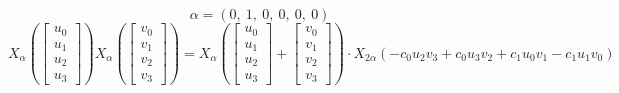 \documentclass[11pt]{article}
\theoremstyle{definition}
\begin{document}
\[
\alpha = \left( 0, \  1, \  0, \  0, \  0, \  0\right)
\]
\[
X_{\alpha}\left(\left[\begin{matrix}u_{0}\\u_{1}\\u_{2}\\u_{3}\end{matrix}\right]\right) X_{\alpha}\left(\left[\begin{matrix}v_{0}\\v_{1}\\v_{2}\\v_{3}\end{matrix}\right]\right) = X_{\alpha}\left(\left[\begin{matrix}u_{0}\\u_{1}\\u_{2}\\u_{3}\end{matrix}\right] + \left[\begin{matrix}v_{0}\\v_{1}\\v_{2}\\v_{3}\end{matrix}\right]\right) \cdot X_{2\alpha}\left(- c_{0} u_{2} v_{3} + c_{0} u_{3} v_{2} + c_{1} u_{0} v_{1} - c_{1} u_{1} v_{0}\right)
\]
\end{document}
